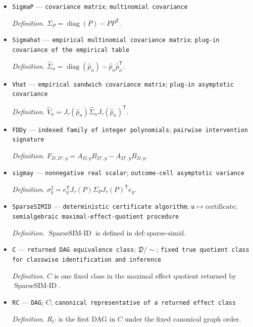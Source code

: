 \documentclass{article}
\begin{document}
\begin{itemize}
  \item \texttt{SigmaP} --- \texttt{covariance matrix}; \texttt{multinomial covariance}
  \par\smallskip\noindent\emph{Definition.} \(\Sigma_P=\operatorname{diag}(P)-PP^{\mathsf T}\).
  \item \texttt{Sigmahat} --- \texttt{empirical multinomial covariance matrix}; \texttt{plug-\allowbreak{}in covariance of the empirical table}
  \par\smallskip\noindent\emph{Definition.} \(\widehat\Sigma_n=\operatorname{diag}(\widehat p_n)-\widehat p_n\widehat p_n^{\mathsf T}\).
  \item \texttt{Vhat} --- \texttt{empirical sandwich covariance matrix}; \texttt{plug-\allowbreak{}in asymptotic covariance}
  \par\smallskip\noindent\emph{Definition.} \(\widehat V_n=J_{\tau}(\widehat p_n)\widehat\Sigma_nJ_{\tau}(\widehat p_n)^{\mathsf T}\).
  \item \texttt{FDDy} --- \texttt{indexed family of integer polynomials}; \texttt{pairwise intervention signature}
  \par\smallskip\noindent\emph{Definition.} \(F_{D,D',y}=A_{D,y}B_{D',y}-A_{D',y}B_{D,y}\).
  \item \texttt{sigmay} --- \texttt{nonnegative real scalar}; \texttt{outcome-\allowbreak{}cell asymptotic variance}
  \par\smallskip\noindent\emph{Definition.} \(\sigma_y^2=e_y^{\mathsf T}J_{\tau}(P)\Sigma_PJ_{\tau}(P)^{\mathsf T}e_y\).
  \item \texttt{SparseSIMID} --- \texttt{deterministic certificate algorithm}; \(\mathfrak u\mapsto\text{certificate}\); \texttt{semialgebraic maximal-\allowbreak{}effect-\allowbreak{}quotient procedure}
  \par\smallskip\noindent\emph{Definition.} \(\operatorname{SparseSIM\text{-}ID}\) is defined in \(\mathrm{def{:}sparse\text{-}simid}\).
  \item \texttt{C} --- \texttt{returned DAG equivalence class}; \(\mathfrak D/{\sim}\); \texttt{fixed true quotient class for classwise identification and inference}
  \par\smallskip\noindent\emph{Definition.} \(C\) is one fixed class in the maximal effect quotient returned by \(\operatorname{SparseSIM\text{-}ID}\).
  \item \texttt{RC} --- \texttt{DAG}; \(C\); \texttt{canonical representative of a returned effect class}
  \par\smallskip\noindent\emph{Definition.} \(R_C\) is the first DAG in \(C\) under the fixed canonical graph order.

\end{itemize}
\end{document}
